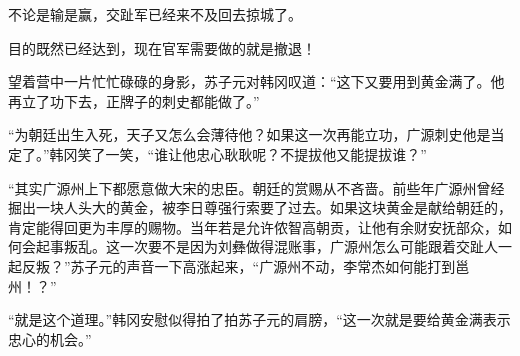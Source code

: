 不论是输是赢，交趾军已经来不及回去掠城了。

目的既然已经达到，现在官军需要做的就是撤退！

望着营中一片忙忙碌碌的身影，苏子元对韩冈叹道：“这下又要用到黄金满了。他再立了功下去，正牌子的刺史都能做了。”

“为朝廷出生入死，天子又怎么会薄待他？如果这一次再能立功，广源刺史他是当定了。”韩冈笑了一笑，“谁让他忠心耿耿呢？不提拔他又能提拔谁？”

“其实广源州上下都愿意做大宋的忠臣。朝廷的赏赐从不吝啬。前些年广源州曾经掘出一块人头大的黄金，被李日尊强行索要了过去。如果这块黄金是献给朝廷的，肯定能得回更为丰厚的赐物。当年若是允许侬智高朝贡，让他有余财安抚部众，如何会起事叛乱。这一次要不是因为刘彝做得混账事，广源州怎么可能跟着交趾人一起反叛？”苏子元的声音一下高涨起来，“广源州不动，李常杰如何能打到邕州！？”

“就是这个道理。”韩冈安慰似得拍了拍苏子元的肩膀，“这一次就是要给黄金满表示忠心的机会。”

